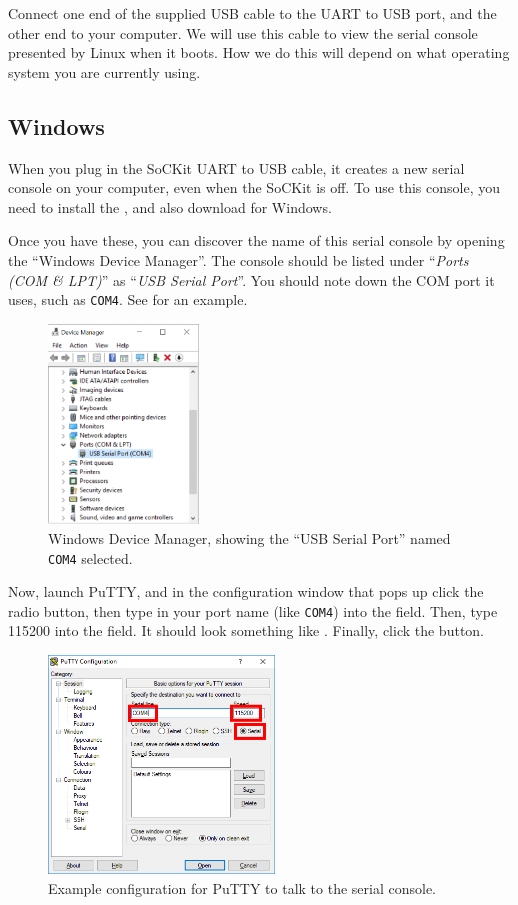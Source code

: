 \documentclass{sockitguide}
\begin{document}
Connect one end of the supplied USB cable to the UART to USB port, and
the other end to your computer. We will use this cable to view the
serial console presented by Linux when it boots. How we do this will
depend on what operating system you are currently using.

\subsection{Windows}

When you plug in the SoCKit UART to USB cable, it creates a new serial
console on your computer, even when the SoCKit is off. To use this
console, you need to install the , and also download
for Windows.

Once you have these, you can discover the name of this serial console
by opening the ``Windows Device Manager''. The console should be
listed under ``\textit{Ports (COM \& LPT)}'' as ``\textit{USB Serial
  Port}''. You should note down the COM port it uses, such as
\texttt{COM4}. See  for an example.

\begin{figure}
  \includegraphics[width=4cm]{figures/devicemanager.png}
  \caption{Windows Device Manager, showing the ``USB Serial Port''
    named \texttt{COM4} selected.}
  \label{fig:devman}
\end{figure}

Now, launch PuTTY, and in the configuration window that pops up click
the  radio button, then type in your port name
(like \texttt{COM4}) into the  field. Then,
type \num{115200} into the  field. It should look
something like . Finally, click the 
button.

\begin{figure}
  \includegraphics[width=6cm]{figures/putty.png}
  \caption{Example configuration for PuTTY to talk to the serial console.}
  \label{fig:putty}
\end{figure}
\end{document}
